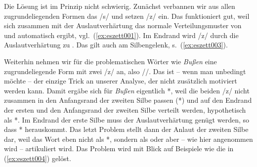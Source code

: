 Die Lösung ist im Prinzip nicht schwierig.
Zunächst verbannen wir aus allen zugrundeliegenden Formen das /s/ und setzen /z/ ein.
Das funktioniert gut, weil sich zusammen mit der Auslautverhärtung das normale Verteilungsmuster von \textipa{[s]} und \textipa{[z]} automatisch ergibt, vgl.\ (\ref{ex:eszett001}).
Im Endrand wird /z/ durch die Auslautverhärtung zu \textipa{[s]}.
Das gilt auch am Silbengelenk, s.\ (\ref{ex:eszett003}).

\begin{exe}
\end{exe}

Weiterhin nehmen wir für die problematischen Wörter wie \textit{Bußen} eine zugrundeliegende Form mit zwei /z/ an, also //.
Das ist -- wenn man unbedingt möchte -- der einzige Trick an unserer Analyse, der nicht zusätzlich motiviert werden kann.
Damit ergäbe sich für \textit{Bußen} eigentlich *\textipa{[bu:s.z@n]}, weil die beiden /z/ nicht zusammen in den Anfangsrand der zweiten Silbe passen (*\textipa{[zz@n]}) und auf den Endrand der ersten und den Anfangsrand der zweiten Silbe verteilt werden, hypothetisch als *\textipa{[bu:z.z@n]}.
Im Endrand der erste Silbe muss der Auslautverhärtung genügt werden, so dass *\textipa{[bu:s.z@n]} herauskommt.
Das letzt Problem stellt dann der Anlaut der zweiten Silbe dar, weil das Wort eben nicht als *\textipa{[bu:s.z@n]}, sondern als \textipa{[bu:.s@n]} oder aber -- wie hier angenommen wird -- \textipa{[bu:s.sen]} artikuliert wird.
Das Problem wird mit Blick auf Beispiele wie die in (\ref{ex:eszett004}) gelöst.

\begin{exe}
  \ex\label{ex:eszett004}
  \begin{xlist}
  \end{xlist}
\end{exe}

